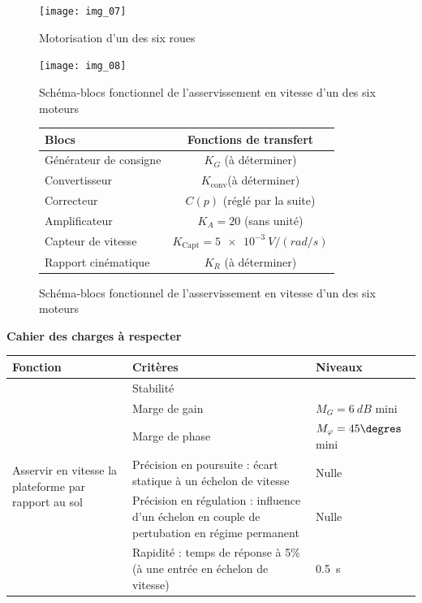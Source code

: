 \begin{figure}[H]
\centering
\texttt{[image: img\_07]}
\caption{Motorisation d'un des six roues\label{img:07}}
\end{figure}

\begin{figure}[H]
\centering
\texttt{[image: img\_08]}
\caption{Schéma-blocs fonctionnel de l’asservissement en vitesse d’un des six moteurs\label{img:08}}
\end{figure}


\begin{figure}[H]
\centering
\begin{tabular}{lc}
\hline
\textbf{Blocs} & \textbf{Fonctions de transfert} 	\\ \hline
Générateur de consigne 	& $K_G$ (à déterminer) 		\\ 
Convertisseur 		& $K_{\text{conv}}$(à déterminer)	\\ 
Correcteur 		& $C(p)$ (réglé par la suite)	\\ 
Amplificateur 		& $K_A = 20 $ (sans unité)	\\ 
Capteur de vitesse 	& $K_{\text{Capt}}= \SI{5e-3}{V/(rad/s)}$ 	\\ 
Rapport cinématique 	& $K_R$ (à déterminer) 	\\ \hline
\end{tabular}

\caption{Schéma-blocs fonctionnel de l’asservissement en vitesse d’un des six moteurs\label{img:09}}
\end{figure}

\textbf{Cahier des charges à respecter}

\begin{center}
\begin{tabular}{lp{9cm}l}
\hline
\textbf{Fonction} & \textbf{Critères} & \textbf{Niveaux} \\ \hline\hline
\multirow{7}{3cm}{Asservir en vitesse la plateforme par rapport au sol} & 
Stabilité & \\ %
& Marge de gain		& $M_G=\SI{6}{dB}$ mini \\ %
& Marge de phase	& $M_{\varphi} =45\degres$ mini \\ \cline{2-3}
& Précision en poursuite : écart statique à un échelon de vitesse & Nulle \\ %
& Précision en régulation : influence d'un échelon en couple de pertubation en régime permanent  & Nulle \\ \cline{2-3}%
& Rapidité : temps de réponse à 5\% (à une entrée en échelon de vitesse) & \SI{0,5}{s} \\ \hline
\end{tabular}
\end{center}
\fi

